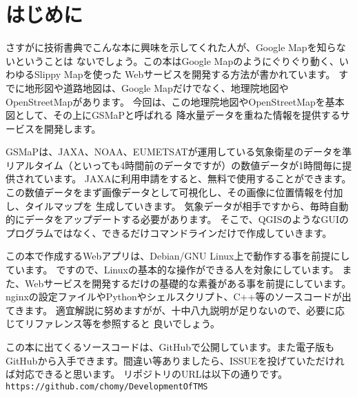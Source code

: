 \chapter*{はじめに}

さすがに技術書典でこんな本に興味を示してくれた人が、Google Mapを知らないということは
ないでしょう。この本はGoogle Mapのようにぐりぐり動く、いわゆるSlippy Mapを使った
Webサービスを開発する方法が書かれています。
すでに地形図や道路地図は、Google Mapだけでなく、地理院地図やOpenStreetMapがあります。
今回は、この地理院地図やOpenStreetMapを基本図として、その上にGSMaPと呼ばれる
降水量データを重ねた情報を提供するサービスを開発します。

GSMaPは、JAXA、NOAA、EUMETSATが運用している気象衛星のデータを準リアルタイム（といっても4時間前のデータですが）の数値データが1時間毎に提供されています。
JAXAに利用申請をすると、無料で使用することができます。
この数値データをまず画像データとして可視化し、その画像に位置情報を付加し、タイルマップを
生成していきます。
気象データが相手ですから、毎時自動的にデータをアップデートする必要があります。
そこで、QGISのようなGUIのプログラムではなく、できるだけコマンドラインだけで作成していきます。

この本で作成するWebアプリは、Debian/GNU Linux上で動作する事を前提にしています。
ですので、Linuxの基本的な操作ができる人を対象にしています。
また、Webサービスを開発するだけの基礎的な素養がある事を前提にしています。
nginxの設定ファイルやPythonやシェルスクリプト、C++等のソースコードが出てきます。
適宜解説に努めますがが、十中八九説明が足りないので、必要に応じてリファレンス等を参照すると
良いでしょう。

この本に出てくるソースコードは、GitHubで公開しています。また電子版もGitHubから入手できます。間違い等ありましたら、ISSUEを投げていただければ対応できると思います。
リポジトリのURLは以下の通りです。\\
\texttt{https://github.com/chomy/DevelopmentOfTMS}


